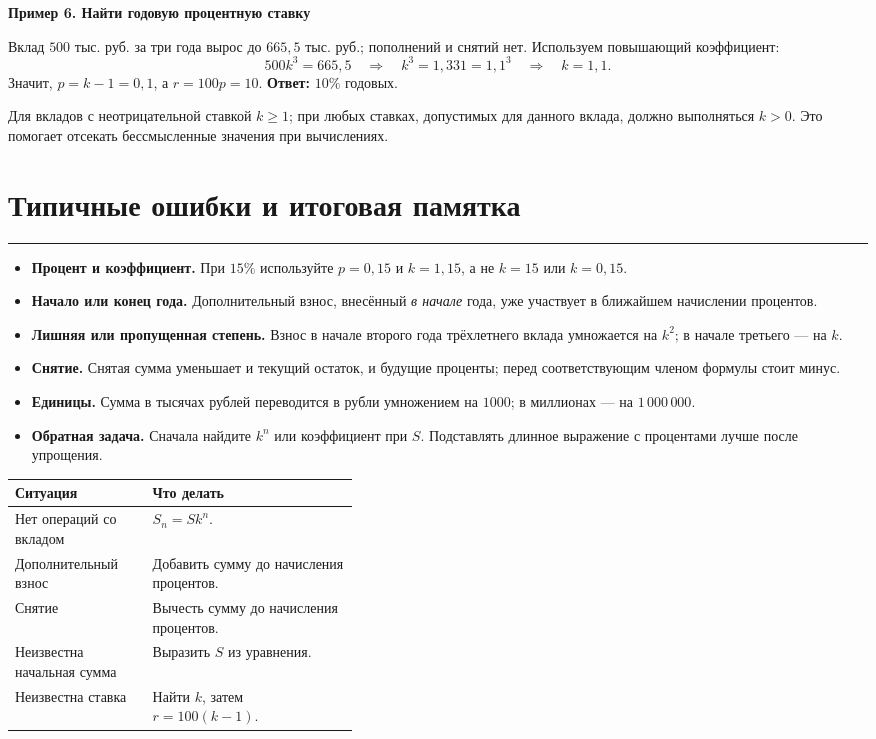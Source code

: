 \documentclass[a4paper,12pt]{article}
\newcommand{\lessonsection}[1]{\section{#1}\vspace{-0.2em}\noindent\textcolor{accent}{\rule{\linewidth}{0.55pt}}\vspace{0.2em}}
\newcommand{\exampletitle}[1]{\par\smallskip\noindent\textcolor{darkaccent}{\textbf{#1}}\par}
\begin{document}
\exampletitle{Пример 6. Найти годовую процентную ставку}
Вклад $500$ тыс. руб. за три года вырос до $665{,}5$ тыс. руб.; пополнений и снятий нет. Используем повышающий коэффициент:
\[
500k^3=665{,}5 \quad\Longrightarrow\quad
k^3=1{,}331=1{,}1^3 \quad\Longrightarrow\quad k=1{,}1.
\]
Значит, $p=k-1=0{,}1$, а $r=100p=10$. \textbf{Ответ:} $10\%$ годовых.

Для вкладов с неотрицательной ставкой $k\ge1$; при любых ставках, допустимых для данного вклада, должно выполняться $k>0$. Это помогает отсекать бессмысленные значения при вычислениях.

\lessonsection{Типичные ошибки и итоговая памятка}
\begin{itemize}
\item \textbf{Процент и коэффициент.} При $15\%$ используйте $p=0{,}15$ и $k=1{,}15$, а не $k=15$ или $k=0{,}15$.
\item \textbf{Начало или конец года.} Дополнительный взнос, внесённый \emph{в начале} года, уже участвует в ближайшем начислении процентов.
\item \textbf{Лишняя или пропущенная степень.} Взнос в начале второго года трёхлетнего вклада умножается на $k^2$; в начале третьего --- на $k$.
\item \textbf{Снятие.} Снятая сумма уменьшает и текущий остаток, и будущие проценты; перед соответствующим членом формулы стоит минус.
\item \textbf{Единицы.} Сумма в тысячах рублей переводится в рубли умножением на $1000$; в миллионах --- на $1\,000\,000$.
\item \textbf{Обратная задача.} Сначала найдите $k^n$ или коэффициент при $S$. Подставлять длинное выражение с процентами лучше после упрощения.
\end{itemize}
\begin{center}
\renewcommand{\arraystretch}{1.25}
\begin{tabularx}{\linewidth}{@{}p{0.40\linewidth}X@{}}
\toprule
Ситуация & Что делать\\
\midrule
Нет операций со вкладом & $S_n=Sk^n$.\\
Дополнительный взнос & Добавить сумму до начисления процентов.\\
Снятие & Вычесть сумму до начисления процентов.\\
Неизвестна начальная сумма & Выразить $S$ из уравнения.\\
Неизвестна ставка & Найти $k$, затем $r=100(k-1)$.\\
\bottomrule
\end{tabularx}
\end{center}
\end{document}
